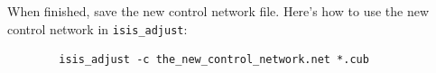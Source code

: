 When finished, save the new control network file. Here's how to use
the new control network in \texttt{isis\_adjust}:

\begin{verbatim}
        isis_adjust -c the_new_control_network.net *.cub
\end{verbatim}

%
%
